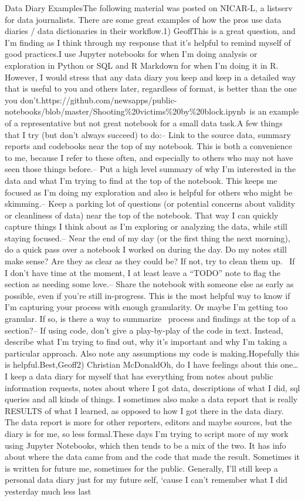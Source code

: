 \documentclass[]{book}
\begin{document}
Data Diary ExamplesThe following material was posted on NICAR-L, a listserv for data journalists. There are some great examples of how the pros use data diaries / data dictionaries in their workflow.1) GeoffThis is a great question, and I'm finding as I think through my response that it's helpful to remind myself of good practices.I use Jupyter notebooks for when I'm doing analysis or exploration in Python or SQL and R Markdown for when I'm doing it in R. However, I would stress that any data diary you keep and keep in a detailed way that is useful to you and others later, regardless of format, is better than the one you don't.https://github.com/newsapps/public-notebooks/blob/master/Shooting\%20victims\%20by\%20block.ipynb~is an example of a representative but not great notebook for a small data task.A few things that I try (but don't always succeed) to do:-- Link to the source data, summary reports and codebooks near the top of my notebook. This is both a convenience to me, because I refer to these often, and especially to others who may not have seen those things before.-- Put a high level summary of why I'm interested in the data and what I'm trying to find at the top of the notebook. This keeps me focused as I'm doing my exploration and also is helpful for others who might be skimming.-- Keep a parking lot of questions (or potential concerns about validity or cleanliness of data) near the top of the notebook. That way I can quickly capture things I think about as I'm exploring or analyzing the data, while still staying focused.-- Near the end of my day (or the first thing the next morning), do a quick pass over a notebook I worked on during the day. Do my notes still make sense? Are they as clear as they could be? If not, try to clean them up.~ If I don't have time at the moment, I at least leave a ``TODO'' note to flag the section as needing some love.-- Share the notebook with someone else as early as possible, even if you're still in-progress. This is the most helpful way to know if I'm capturing your process with enough granularity. Or maybe I'm getting too granular. If so, is there a way to summarize~ process and findings at the top of a section?-- If using code, don't give a play-by-play of the code in text. Instead, describe what I'm trying to find out, why it's important and why I'm taking a particular approach. Also note any assumptions my code is making.Hopefully this is helpful.Best,Geoff2) Christian McDonaldOh, do I have feelings about this one\ldots{}I keep a data diary for myself that has everything from notes about public information requests, notes about where I got data, descriptions of what I did, sql queries and all kinds of things. I sometimes also make a data report that is really RESULTS of what I learned, as opposed to how I got there in the data diary. The data report is more for other reporters, editors and maybe sources, but the diary is for me, so less formal.These days I'm trying to script more of my work using Jupyter Notebooks, which then tends to be a mix of the two. It has info about where the data came from and the code that made the result. Sometimes it is written for future me, sometimes for the public. Generally, I'll still keep a personal data diary just for my future self, `cause I can't remember what I did yesterday much less last 
\end{document}
